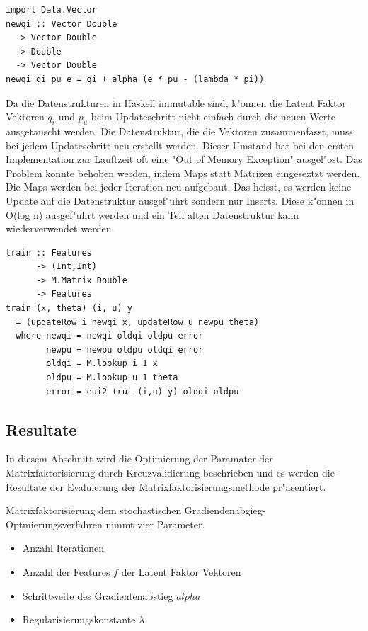 \documentclass[a4paper, 12pt]{article}
\begin{document}
\begin{lstlisting}[caption=Berechnung eines Featurevektors, label={lst:step}]
import Data.Vector 
newqi :: Vector Double
  -> Vector Double
  -> Double
  -> Vector Double
newqi qi pu e = qi + alpha (e * pu - (lambda * pi))
\end{lstlisting}

Da die Datenstrukturen in Haskell immutable sind, k"onnen die Latent Faktor Vektoren $q_i$ und $p_u$ beim Updateschritt nicht einfach durch die neuen Werte ausgetauscht werden. Die Datenstruktur, die die Vektoren zusammenfasst, muss bei jedem Updateschritt neu erstellt werden. Dieser Umstand hat bei den ersten Implementation zur Lauftzeit oft eine "Out of Memory Exception" ausgel"ost. Das Problem konnte behoben werden, indem Maps statt Matrizen eingeseztzt werden. Die Maps werden bei jeder Iteration neu aufgebaut. Das heisst, es werden keine Update auf die Datenstruktur ausgef"uhrt sondern nur Inserts. Diese k"onnen in O(log n) ausgef"uhrt werden und ein Teil alten Datenstruktur kann wiederverwendet werden.

\begin{lstlisting}[caption=Implementation Funk SGD, label=lst:sgd] 
train :: Features
      -> (Int,Int) 
      -> M.Matrix Double 
      -> Features
train (x, theta) (i, u) y
  = (updateRow i newqi x, updateRow u newpu theta)
  where newqi = newqi oldqi oldpu error
        newpu = newpu oldpu oldqi error
        oldqi = M.lookup i 1 x
        oldpu = M.lookup u 1 theta
        error = eui2 (rui (i,u) y) oldqi oldpu  
\end{lstlisting}

\subsection{Resultate}
\label{sec:matrixfactorresults}
In diesem Abschnitt wird die Optimierung der Paramater der Matrixfaktorisierung durch Kreuzvalidierung beschrieben und es werden die Resultate der Evaluierung der Matrixfaktorisierungsmethode pr"asentiert. 

Matrixfaktorisierung dem stochastischen Gradiendenabgieg-Optmierungsverfahren  nimmt vier Parameter.
\begin{itemize}
\item Anzahl Iterationen
\item Anzahl der Features $f$ der Latent Faktor Vektoren
\item Schrittweite des Gradientenabstieg $alpha$
\item Regularisierungskonstante $\lambda$
\end{itemize}
\end{document}
